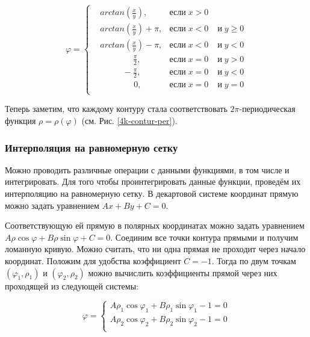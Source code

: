 \documentclass[a4paper,12pt, titlepage]{article}
\begin{document}
\[
\varphi = 
 	\left\{
 		\begin{aligned}
  		& arctan\left(\frac{x}{y}\right),       & \text{если}\;x>0 & \\
 		& arctan\left(\frac{x}{y}\right) + \pi, & \text{если}\;x<0 &\;\text{и}\;y\ge 0\\
  		& arctan\left(\frac{x}{y}\right) - \pi, & \text{если}\;x<0 &\;\text{и}\;y<0 \\
  		& \mspace{70mu}\frac{\pi}{2},                        & \text{если}\;x=0 &\;\text{и}\;y>0 \\
  		& \mspace{48mu}-\frac{\pi}{2},    					& \text{если}\;x=0 &\;\text{и}\;y<0 \\
		& \mspace{72mu}    	0,								& \text{если}\;x=0 &\;\text{и}\;y=0 \\
		\end{aligned}
	\right.
\]

Теперь заметим, что каждому контуру стала соответствовать $2\pi$-периодическая функция 
$\rho = \rho(\varphi)$ (см. Рис. \ref{4k-contur-per}).

\subsubsection{Интерполяция на равномерную сетку}
Можно проводить различные операции с данными функциями, в том числе и интегрировать. Для того  чтобы проинтегрировать данные 
функции, проведём их интерполяцию на равномерную сетку.  В декартовой системе координат прямую можно задать уравнением
 $Ax+By+C=0$. 

Соответствующую ей прямую в полярных координатах можно задать уравнением $A\rho\cos\varphi+B\rho\sin\varphi+C=0$. Соединим все 
точки контура прямыми и получим  ломанную кривую. Можно считать, что ни одна прямая не проходит через начало координат.  Положим 
для удобства коэффициент $C=-1$. Тогда по двум точкам $({\varphi}_{1}, {\rho}_{1})$ и $({\varphi}_{2}, {\rho}_{2})$  можно 
вычислить коэффициенты прямой через них проходящей из следующей системы:

\[
\varphi = 
 	\left\{
 		\begin{aligned}
  		A{\rho}_{1}\cos{\varphi}_{1}+B{\rho}_{1}\sin{\varphi}_{1}-1=0 \\
 		A{\rho}_{2}\cos{\varphi}_{2}+B{\rho}_{2}\sin{\varphi}_{2}-1=0 \\
		\end{aligned}
	\right.
\]
\end{document}
